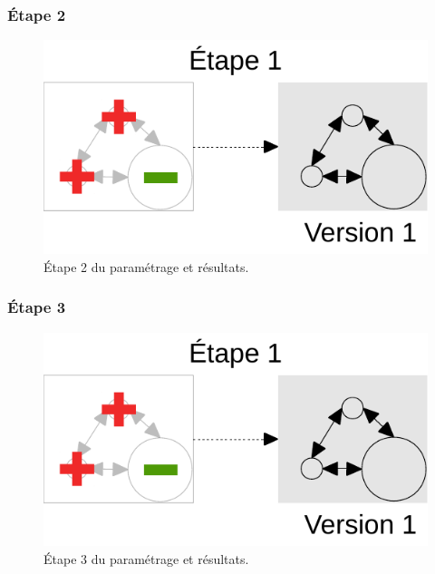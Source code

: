 	\subsubsection{Étape 2}
		\begin{figure}[H]
				\centering
				\includegraphics[width = \linewidth, page = 2]{img/schemas_etapes_individuelles.pdf}
				\caption{Étape 2 du paramétrage et résultats.}
		\end{figure}

\pagebreak
	\subsubsection{Étape 3}
		\begin{figure}[H]
			\centering
			\includegraphics[width = \linewidth, page = 3]{img/schemas_etapes_individuelles.pdf}
			\caption{Étape 3 du paramétrage et résultats.}
		\end{figure}

\pagebreak
